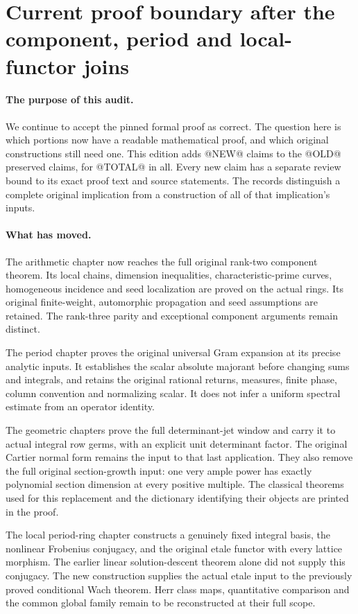 \section{Current proof boundary after the component, period and local-functor joins}
\label{sec:dependency-audit-v57}

\paragraph{The purpose of this audit.}
We continue to accept the pinned formal proof as correct.  The question
here is which portions now have a readable mathematical proof, and which
original constructions still need one.  This edition adds @NEW@ claims
to the @OLD@ preserved claims, for @TOTAL@ in all.  Every new claim has
a separate review bound to its exact proof text and source statements.
The records distinguish a complete original implication from a construction
of all of that implication's inputs.

\paragraph{What has moved.}
The arithmetic chapter now reaches the full original rank-two component
theorem.  Its local chains, dimension inequalities, characteristic-prime
curves, homogeneous incidence and seed localization are proved on the
actual rings.  Its original finite-weight, automorphic propagation and
seed assumptions are retained.  The rank-three parity and exceptional
component arguments remain distinct.

The period chapter proves the original universal Gram expansion at its
precise analytic inputs.  It establishes the scalar absolute majorant
before changing sums and integrals, and retains the original rational
returns, measures, finite phase, column convention and normalizing scalar.
It does not infer a uniform spectral estimate from an operator identity.

The geometric chapters prove the full determinant-jet window and carry it
to actual integral row germs, with an explicit unit determinant factor.
The original Cartier normal form remains the input to that last
application.  They also remove the full original section-growth input:
one very ample power has exactly polynomial section dimension at every
positive multiple.  The classical theorems used for this replacement and
the dictionary identifying their objects are printed in the proof.

The local period-ring chapter constructs a genuinely fixed integral basis,
the nonlinear Frobenius conjugacy, and the original etale functor with
every lattice morphism.  The earlier linear solution-descent theorem
alone did not supply this conjugacy.  The new construction supplies the
actual etale input to the previously proved conditional Wach theorem.
Herr class maps, quantitative comparison and the common global family
remain to be reconstructed at their full scope.

